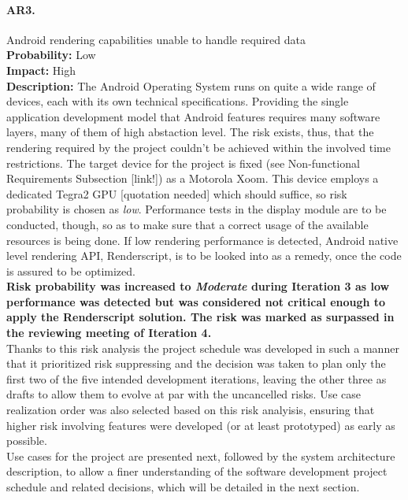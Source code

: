 		\paragraph{AR3.}Android rendering capabilities unable to handle required data\\
		\textbf{Probability:} Low\\
		\textbf{Impact:} High\\
		\textbf{Description:} The Android Operating System runs on quite a wide range of devices, each with its own technical specifications. Providing the single application development model that Android features requires many software layers, many of them of high abstaction level. The risk exists, thus, that the rendering required by the project couldn't be achieved within the involved time restrictions. The target device for the project is fixed (see Non-functional Requirements Subsection [link!]) as a Motorola Xoom. This device employs a dedicated Tegra2 GPU [quotation needed] which should suffice, so risk probability is chosen as \emph{low}. Performance tests in the display module are to be conducted, though, so as to make sure that a correct usage of the available resources is being done. 
		If low rendering performance is detected, Android native level rendering API, Renderscript, is to be looked into as a remedy, once the code is assured to be optimized.
		\\
		\textbf{Risk probability was increased to \emph{Moderate} during Iteration 3 as low performance was detected but was considered not critical enough to apply the Renderscript solution. The risk was marked as surpassed in the reviewing meeting of Iteration 4.}\\

		Thanks to this risk analysis the project schedule was developed in such a manner that it prioritized risk suppressing and the decision was taken to plan only the first two of the five intended development iterations, leaving the other three as drafts to allow them to evolve at par with the uncancelled risks.
		Use case realization order was also selected based on this risk analyisis, ensuring that higher risk involving features were developed (or at least prototyped) as early as possible.\\
		
		Use cases for the project are presented next, followed by the system architecture description, to allow a finer understanding of the software development project schedule and related decisions, which will be detailed in the next section.
	
